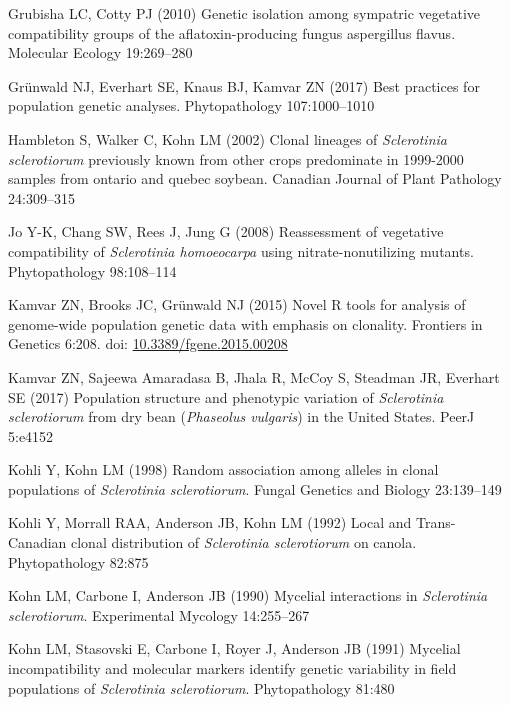 \hypertarget{ref-Grubisha2010-ld}{}
Grubisha LC, Cotty PJ (2010) Genetic isolation among sympatric
vegetative compatibility groups of the aflatoxin-producing fungus
aspergillus flavus. Molecular Ecology 19:269--280

\hypertarget{ref-Grunwald2017-wd}{}
Grünwald NJ, Everhart SE, Knaus BJ, Kamvar ZN (2017) Best practices for
population genetic analyses. Phytopathology 107:1000--1010

\hypertarget{ref-Hambleton2002-an}{}
Hambleton S, Walker C, Kohn LM (2002) Clonal lineages of
\emph{Sclerotinia sclerotiorum} previously known from other crops
predominate in 1999-2000 samples from ontario and quebec soybean.
Canadian Journal of Plant Pathology 24:309--315

\hypertarget{ref-Jo2008-ft}{}
Jo Y-K, Chang SW, Rees J, Jung G (2008) Reassessment of vegetative
compatibility of \emph{Sclerotinia homoeocarpa} using
nitrate-nonutilizing mutants. Phytopathology 98:108--114

\hypertarget{ref-Kamvar2015-ff}{}
Kamvar ZN, Brooks JC, Grünwald NJ (2015) Novel R tools for analysis of
genome-wide population genetic data with emphasis on clonality.
Frontiers in Genetics 6:208. doi:
\href{https://doi.org/10.3389/fgene.2015.00208}{10.3389/fgene.2015.00208}

\hypertarget{ref-Kamvar2017-cl}{}
Kamvar ZN, Sajeewa Amaradasa B, Jhala R, McCoy S, Steadman JR, Everhart
SE (2017) Population structure and phenotypic variation of
\emph{Sclerotinia sclerotiorum} from dry bean (\emph{Phaseolus
vulgaris}) in the United States. PeerJ 5:e4152

\hypertarget{ref-Kohli1998-hh}{}
Kohli Y, Kohn LM (1998) Random association among alleles in clonal
populations of \emph{Sclerotinia sclerotiorum}. Fungal Genetics and
Biology 23:139--149

\hypertarget{ref-Kohli1992-pe}{}
Kohli Y, Morrall RAA, Anderson JB, Kohn LM (1992) Local and
Trans-Canadian clonal distribution of \emph{Sclerotinia sclerotiorum} on
canola. Phytopathology 82:875

\hypertarget{ref-Kohn1990-po}{}
Kohn LM, Carbone I, Anderson JB (1990) Mycelial interactions in
\emph{Sclerotinia sclerotiorum}. Experimental Mycology 14:255--267

\hypertarget{ref-Kohn1991-wq}{}
Kohn LM, Stasovski E, Carbone I, Royer J, Anderson JB (1991) Mycelial
incompatibility and molecular markers identify genetic variability in
field populations of \emph{Sclerotinia sclerotiorum}. Phytopathology 81:480

